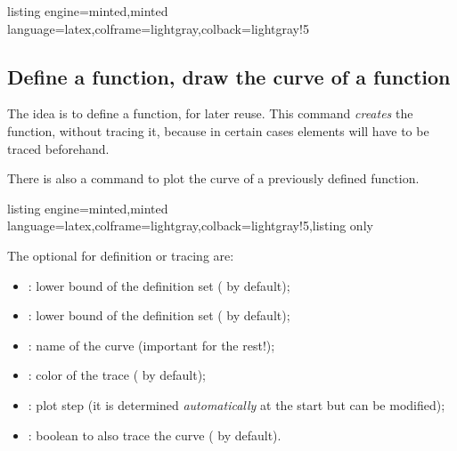 \documentclass[11pt,a4paper]{ltxdoc}
\begin{document}
\begin{tcblisting}{listing engine=minted,minted language=latex,colframe=lightgray,colback=lightgray!5}
\begin{GraphTikz}%
	[x=0.8cm,y=1cm,Xmin=-7,Xmax=4,Ymin=-3,Ymax=5]
\end{GraphTikz}
\end{tcblisting}

\pagebreak

\subsection{Define a function, draw the curve of a function}\label{deftracfct}

The idea is to define a function, for later reuse. This command \textit{creates} the function, without tracing it, because in certain cases elements will have to be traced beforehand.

\smallskip

There is also a command to plot the curve of a previously defined function.

\begin{tcblisting}{listing engine=minted,minted language=latex,colframe=lightgray,colback=lightgray!5,listing only}
\end{tcblisting}

The optional \MontreCode{[keys]} for definition or tracing are:

\smallskip

\begin{itemize}
	\item {}: lower bound of the definition set ( by default);
	\item {}: lower bound of the definition set ( by default);
	\item {}: name of the curve (important for the rest!);
	\item {}: color of the trace ( by default);
	\item {}: plot step (it is determined \textit{automatically} at the start but can be modified);
	\item {}: boolean to also trace the curve ( by default).
\end{itemize}
\end{document}
